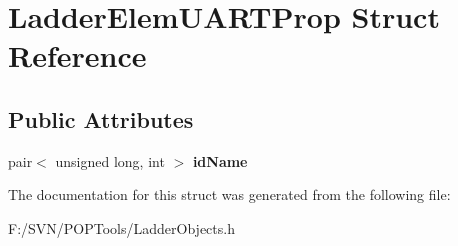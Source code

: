 \hypertarget{struct_ladder_elem_u_a_r_t_prop}{\section{Ladder\-Elem\-U\-A\-R\-T\-Prop Struct Reference}
\label{struct_ladder_elem_u_a_r_t_prop}
}
\subsection*{Public Attributes}
\begin{DoxyCompactItemize}
\item 
\hypertarget{struct_ladder_elem_u_a_r_t_prop_aec9a340a5f28fd6ef655dfa2712d6dec}{pair$<$ unsigned long, int $>$ {\bfseries id\-Name}}\label{struct_ladder_elem_u_a_r_t_prop_aec9a340a5f28fd6ef655dfa2712d6dec}

\end{DoxyCompactItemize}


The documentation for this struct was generated from the following file\-:\begin{DoxyCompactItemize}
\item 
F\-:/\-S\-V\-N/\-P\-O\-P\-Tools/Ladder\-Objects.\-h\end{DoxyCompactItemize}
